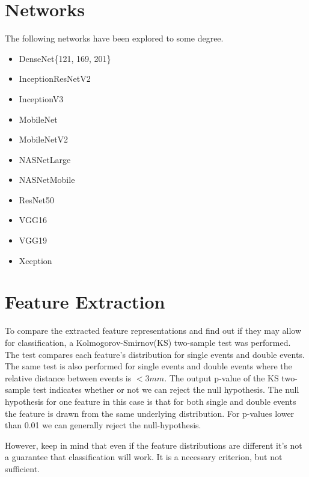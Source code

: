 \documentclass[12pt, notitlepage]{article}
\begin{document}
\section{Networks}
The following networks have been explored to some degree.
\begin{itemize}
    \item DenseNet\{121, 169, 201\}
    \item InceptionResNetV2
    \item InceptionV3
    \item MobileNet
    \item MobileNetV2
    \item NASNetLarge
    \item NASNetMobile
    \item ResNet50
    \item VGG16
    \item VGG19
    \item Xception
\end{itemize}
\section{Feature Extraction}
To compare the extracted feature representations and find out if they may allow for classification,
a Kolmogorov-Smirnov(KS) two-sample test was performed. The test compares each feature's distribution
for single events and double events. The same test is also performed for single events and double events 
where the relative distance between events is $< 3mm$. The output p-value of the KS two-sample test
indicates whether or not we can reject the null hypothesis. The null hypothesis for one feature in this 
case is that for both single and double events the feature is drawn from the same underlying distribution.
For p-values lower than 0.01 we can generally reject the null-hypothesis. 

However, keep in mind that even if the feature distributions are different it's not a guarantee that 
classification will work. It is a necessary criterion, but not sufficient.


\end{document}
